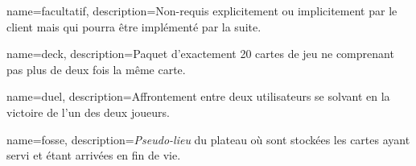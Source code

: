  {
    name={facultatif},
    description={Non-requis explicitement ou implicitement par le client mais qui pourra être implémenté par la suite.}
}

 {
    name={deck},
    description={Paquet d'exactement 20 cartes de jeu ne comprenant pas plus de deux fois la même carte.}
}

 {
    name={duel},
    description={Affrontement entre deux utilisateurs se solvant en la victoire de l'un des deux joueurs.}
}

 {
    name={fosse},
    description={\textit{Pseudo-lieu} du plateau où sont stockées les cartes ayant servi et étant arrivées en fin de vie.}
}

